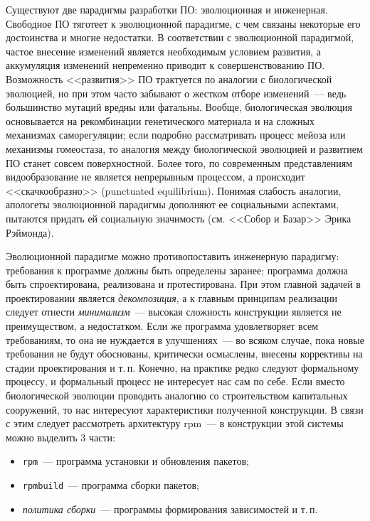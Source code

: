 \documentclass[russian,a4paper,12pt,titlepage]{article}
\begin{document}
Существуют две парадигмы разработки ПО: эволюционная и инженерная.  Свободное ПО тяготеет к эволюционной парадигме, с чем связаны
некоторые его достоинства и многие недостатки.  В соответствии с эволюционной парадигмой, частое внесение изменений является необходимым
условием развития, а аккумуляция изменений непременно приводит к совершенствованию ПО.  Возможность <<развития>> ПО трактуется
по аналогии с биологической эволюцией, но при этом часто забывают о жестком отборе изменений~--- ведь большинство мутаций
вредны или фатальны.  Вообще, биологическая эволюция основывается на рекомбинации генетического материала и на сложных механизмах
саморегуляции; если подробно рассматривать процесс мейоза или механизмы гомеостаза, то аналогия между биологической эволюцией
и развитием ПО станет совсем поверхностной.  Более того, по современным представлениям видообразование не является непрерывным процессом,
а происходит <<скачкообразно>> (punctuated equilibrium).
Понимая слабость аналогии, апологеты эволюционной парадигмы дополняют ее социальными аспектами, пытаются
придать ей социальную значимость (см. <<Собор и Базар>> Эрика Рэймонда).

Эволюционной парадигме можно противопоставить инженерную парадигму: требования к программе должны быть определены заранее;
программа должна быть спроектирована, реализована и протестирована.  При этом главной задачей в проектировании является
\emph{декомпозиция}, а к главным принципам реализации следует отнести \emph{минимализм}~--- 
высокая сложность конструкции является не преимуществом, а недостатком.  Если же программа удовлетворяет всем требованиям,
то она не нуждается в улучшениях~--- во всяком случае, пока новые требования не будут обоснованы, критически осмыслены, внесены
коррективы на стадии проектирования и т.\,п.  Конечно, на практике редко следуют формальному процессу, и формальный процесс
не интересует нас сам по себе.  Если вместо биологической эволюции проводить аналогию со строительством капитальных сооружений,
то нас интересуют характеристики полученной конструкции.  В связи с этим следует рассмотреть архитектуру rpm~---
в конструкции этой системы можно выделить 3 части:
\begin{itemize}
\item \verb|rpm|~--- программа установки и обновления пакетов;
\item \verb|rpmbuild|~--- программа сборки пакетов;
\item \emph{политика сборки}~--- программы формирования зависимостей и т.\,п.
\end{itemize}
\end{document}
